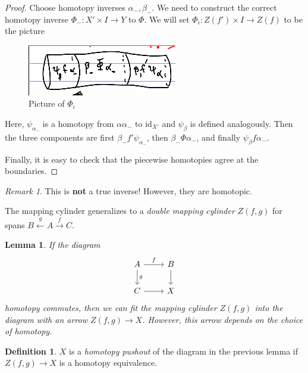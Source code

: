\documentclass[leqno, openany]{memoir}
\newtheorem{lem}[thm]{Lemma}
\theoremstyle{definition}
\newtheorem{defn}[thm]{Definition}
\theoremstyle{remark}
\newtheorem{rmk}[thm]{Remark}
\theoremstyle{plain}
\theoremstyle{definition}
\theoremstyle{remark}
\newcommand{\mr}[1]{\mathrm{#1}}
\begin{document}
\begin{proof}
    Choose homotopy inverses $\alpha_-, \beta_-$. We need to construct the correct homotopy inverse $\Phi_-: X' \times I \to Y$ to $\Phi$. We will set $\Phi_i: Z(f') \times I \to Z(f)$ to be the picture
    \begin{figure}[H]
        \centering
        \includegraphics[width=0.8\linewidth]{mcyl}
        \caption{Picture of $\Phi_i$}%
        \label{fig:}
    \end{figure}
    Here, $\psi_{\alpha_-}$ is a homotopy from $\alpha \alpha_-$ to $\mr{id}_{X'}$ and $\psi_{\beta}$ is defined analogously. Then the three components are first $\beta_- f' \psi_{\alpha_-}$, then $\beta_- \Phi \alpha_-$, and finally $\psi_{\beta} f \alpha_-$.

    Finally, it is easy to check that the piecewise homotopies agree at the boundaries.
\end{proof}

\begin{rmk}
    This is \textbf{not} a true inverse! However, they are homotopic.
\end{rmk}

The mapping cylinder generalizes to a \textit{double mapping cylinder} $Z(f,g)$ for spans $B \xleftarrow{g} A \xrightarrow{f} C$. 

\begin{lem}
    If the diagram
    \begin{equation}
    \begin{tikzcd}
        A \arrow{r}{f} \arrow{d}{g} & B \arrow{d} \\
        C \arrow{r} & X
    \end{tikzcd}
    \end{equation}
    homotopy commutes, then we can fit the mapping cylinder $Z(f,g)$ into the diagram with an arrow $Z(f,g) \to X$. However, this arrow depends on the choice of homotopy.
\end{lem}

\begin{defn}
    $X$ is a \textit{homotopy pushout}  of the diagram in the previous lemma if $Z(f,g) \to X$ is a homotopy equivalence.
\end{defn}
\end{document}
